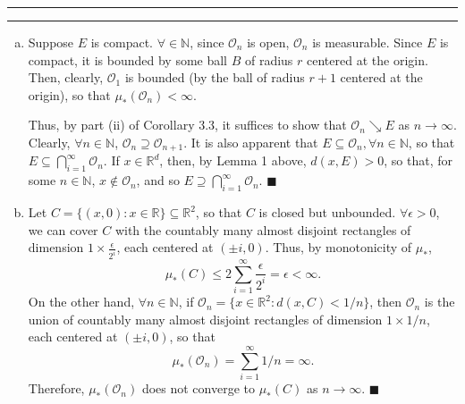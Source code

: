 \documentclass[11pt]{article}
\newcounter{questionCounter}
\newcounter{partCounter}[questionCounter]
\newenvironment{question}[2][\arabic{questionCounter}]{%
    \setcounter{partCounter}{0}%
    \vspace{.25in} \hrule \vspace{0.5em}%
        \noindent{\bf #2}%
    \vspace{0.8em} \hrule \vspace{.10in}%
    \addtocounter{questionCounter}{1}%
}{}
\renewcommand{\qed}{\quad $\blacksquare$}
\newcommand{\N}{\mathbb{N}} %
\newcommand{\R}{\mathbb{R}} %
\renewcommand{\O}{\mathcal{O}}
\begin{document}
\begin{question}{Chapter 1, Problem 5}
\begin{enumerate}[(a)]
\item Suppose $E$ is compact. $\forall \in \N$, since $\O_n$ is open, $\O_n$
is measurable. Since $E$ is compact, it is bounded by some ball $B$ of radius
$r$ centered at the origin. Then, clearly, $\O_1$ is bounded (by the ball of
radius $r + 1$ centered at the origin), so that $\mu_*(\O_n) < \infty$.

Thus, by part (ii) of Corollary 3.3, it suffices to show that $\O_n \searrow E$
as $n \rightarrow \infty$. Clearly,
$\forall n \in \N$, $\O_n \supseteq \O_{n + 1}$. It is also apparent that
$E \subseteq \O_n, \forall n \in \N$, so that
$E \subseteq \bigcap_{i = 1}^{\infty} \O_n$. If $x \in \R^d$, then, by Lemma 1
above, $d(x,E) > 0$, so that, for some $n \in \N$, $x \notin \O_n$, and so
$E \supseteq \bigcap_{i = 1}^{\infty} \O_n$. \qed

\newpage
\item Let $C = \{(x,0) : x \in \R\} \subseteq \R^2$, so that $C$ is closed but
unbounded. $\forall \epsilon > 0$, we can cover $C$ with the countably
many almost disjoint rectangles of dimension $1 \times \frac{\epsilon}{2^i}$,
each centered at $(\pm i,0)$. Thus, by monotonicity of $\mu_*$,
\[\mu_*(C)
 \leq 2 \sum_{i = 1}^{\infty} \frac{\epsilon}{2^i}
 =    \epsilon
 <    \infty
.\]
On the other hand, $\forall n \in \N$, if
$\O_n = \{x \in \R^2 : d(x,C) < 1/n\}$, then $\O_n$ is the union of
countably many almost disjoint rectangles of dimension $1 \times 1/n$, each
centered at $(\pm i, 0)$, so that
\[
\mu_*(\O_n)
 = \sum_{i = 1}^{\infty} 1/n
 = \infty.
\]
Therefore, $\mu_*(\O_n)$ does not converge to $\mu_*(C)$ as
$n \rightarrow \infty$. \qed
\end{enumerate}
\end{question}
\end{document}
